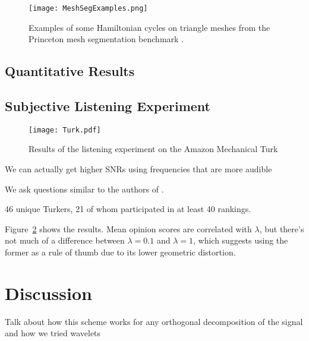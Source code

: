 \documentclass[runningheads]{llncs}
\begin{document}
\begin{figure}
  \centering
  \texttt{[image: MeshSegExamples.png]}
  \caption{Examples of some Hamiltonian cycles on triangle meshes from the Princeton mesh segmentation benchmark \cite{Chen:2009:ABF}.}
  \label{fig:meshsegexamples}
\end{figure}

\subsection{Quantitative Results}

\subsection{Subjective Listening Experiment}

\begin{figure}
  \centering
  \texttt{[image: Turk.pdf]}
  \caption{Results of the listening experiment on the Amazon Mechanical Turk}
  \label{fig:TurkResults}
\end{figure}


We can actually get higher SNRs using frequencies that are more audible

We ask questions similar to the authors of \cite{bassia2001robust}.

46 unique Turkers, 21 of whom participated in at least 40 rankings.

Figure~\ref{fig:TurkResults} shows the results.  Mean opinion scores are correlated with $\lambda$, but there's not much of a difference between $\lambda=0.1$ and $\lambda=1$, which suggests using the former as a rule of thumb due to its lower geometric distortion.

\section{Discussion}


Talk about how this scheme works for any orthogonal decomposition of the signal and how we tried wavelets

%
%
%


%
\end{document}
